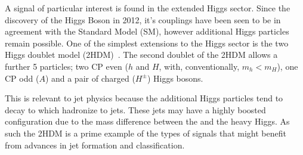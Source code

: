 A signal of particular interest is found in the extended Higgs sector.
Since the discovery of the Higgs Boson in 2012, it's couplings
have been seen to be in agreement with the Standard Model (SM),
however additional Higgs particles remain possible.
One of the simplest extensions to the Higgs sector is the two Higgs doublet model (2HDM)~\cite{Branco2012THDM}.
The second doublet of the 2HDM allows a further 5 particles;
two CP even (\(h\) and \(H\), with, conventionally, \(m_h < m_H\)),
one CP odd (\(A\))
and a pair of charged (\(H^\pm\)) Higgs bosons.

This is relevant to jet physics because the additional Higgs particles tend to decay to  which hadronize to jets.
These jets may have a highly boosted configuration due to the mass difference between the  and the heavy Higgs.
As such the 2HDM is a prime example of the types of signals that might benefit from advances in jet formation and classification.
